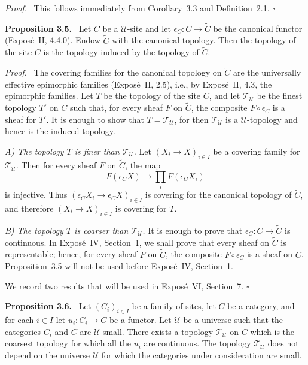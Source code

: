 \documentclass[11pt]{article}
\newcommand{\U}{\mathcal{U}}
\newcommand{\qedtext}{\hfill\(\square\)}
\newenvironment{statement}[1]{\par\medskip\noindent\textbf{#1.}\ }{\par\medskip}
\newenvironment{prooftext}{\par\noindent\emph{Proof.}\ }{\par\medskip}
\begin{document}
\begin{prooftext}
This follows immediately from Corollary~3.3 and Definition~2.1. \qedtext
\end{prooftext}

\begin{statement}{Proposition 3.5}
Let \(C\) be a \(\U\)-site and let \(\epsilon_C:C\to\widetilde C\) be the canonical functor (Expos\'e~II, 4.4.0). Endow \(\widetilde C\) with the canonical topology. Then the topology of the site \(C\) is the topology induced by the topology of \(\widetilde C\).
\end{statement}

\begin{prooftext}
The covering families for the canonical topology on \(\widetilde C\) are the universally effective epimorphic families (Expos\'e~II, 2.5), i.e., by Expos\'e~II, 4.3, the epimorphic families. Let \(T\) be the topology of the site \(C\), and let \(\mathcal T_\U\) be the finest topology \(T'\) on \(C\) such that, for every sheaf \(F\) on \(\widetilde C\), the composite \(F\circ\epsilon_C\) is a sheaf for \(T'\). It is enough to show that \(T=\mathcal T_\U\), for then \(\mathcal T_\U\) is a \(\U\)-topology and hence is the induced topology.

\emph{A) The topology \(T\) is finer than \(\mathcal T_\U\).} Let \((X_i\to X)_{i\in I}\) be a covering family for \(\mathcal T_\U\). Then for every sheaf \(F\) on \(\widetilde C\), the map
\[
F(\epsilon_CX)\longrightarrow\prod_iF(\epsilon_CX_i)
\]
is injective. Thus \((\epsilon_CX_i\to\epsilon_CX)_{i\in I}\) is covering for the canonical topology of \(\widetilde C\), and therefore \((X_i\to X)_{i\in I}\) is covering for \(T\).

\emph{B) The topology \(T\) is coarser than \(\mathcal T_\U\).} It is enough to prove that \(\epsilon_C:C\to\widetilde C\) is continuous. In Expos\'e~IV, Section~1, we shall prove that every sheaf on \(\widetilde C\) is representable; hence, for every sheaf \(F\) on \(\widetilde C\), the composite \(F\circ\epsilon_C\) is a sheaf on \(C\). Proposition~3.5 will not be used before Expos\'e~IV, Section~1.

We record two results that will be used in Expos\'e~VI, Section~7. \qedtext
\end{prooftext}

\begin{statement}{Proposition 3.6}
Let \((C_i)_{i\in I}\) be a family of sites, let \(C\) be a category, and for each \(i\in I\) let \(u_i:C_i\to C\) be a functor. Let \(\U\) be a universe such that the categories \(C_i\) and \(C\) are \(\U\)-small. There exists a topology \(\mathcal T_\U\) on \(C\) which is the coarsest topology for which all the \(u_i\) are continuous. The topology \(\mathcal T_\U\) does not depend on the universe \(\U\) for which the categories under consideration are small.
\end{statement}
\end{document}
